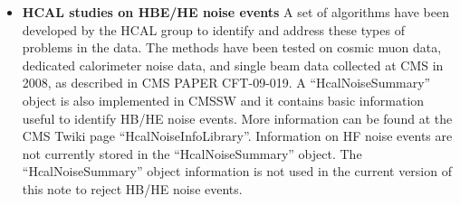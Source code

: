\begin{itemize}

\item{\bf HCAL studies on HBE/HE noise events} A set of algorithms have been developed by the HCAL group to 
identify and address these types of problems in the data. The methods have been tested on cosmic muon data, 
dedicated calorimeter noise data, and single beam data collected at CMS in 2008, 
as described in CMS PAPER CFT-09-019. A ``HcalNoiseSummary'' object 
is also implemented in CMSSW and it contains basic information useful to identify HB/HE noise events.
More information can be found at 
the CMS Twiki page ``HcalNoiseInfoLibrary''.
Information on HF noise events are not currently stored in the ``HcalNoiseSummary'' object.
The ``HcalNoiseSummary'' object information is not used in the current version of this note
to reject HB/HE noise events.


\end{itemize}
